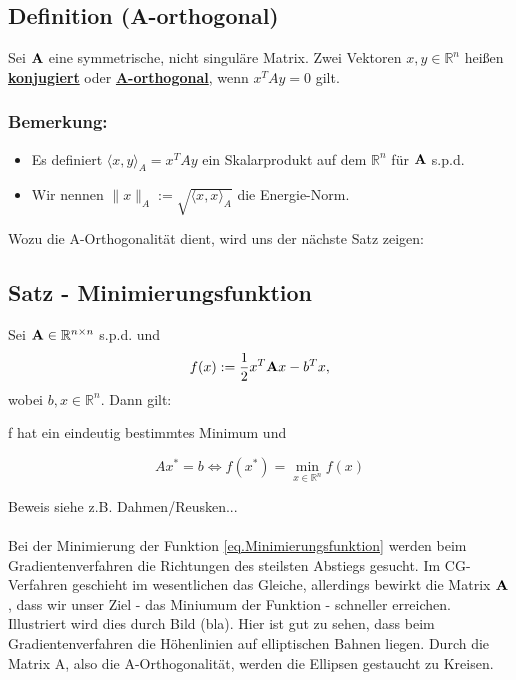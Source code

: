 \subsection{Definition (A-orthogonal)}
Sei ${\textbf{A}}$ eine symmetrische, nicht singuläre Matrix. Zwei Vektoren $x,y \in \mathbb{R}^{n}$ heißen \underline{\textbf{konjugiert}} oder \underline{\textbf{A-orthogonal}}, wenn $x^{T}Ay = 0$ gilt.

\subsubsection{Bemerkung:}
\begin{itemize}
\item Es definiert $\langle x,y \rangle _{A} = x^{T}Ay$ ein Skalarprodukt auf dem $\mathbb{R}^{n}$ für ${\textbf{A}}$ s.p.d.
\item Wir nennen $\|x\|_{A} := \sqrt{\langle x, x \rangle _{A}}$ die Energie-Norm.
\end{itemize}

Wozu die A-Orthogonalität dient, wird uns der nächste Satz zeigen:

\subsection{Satz - Minimierungsfunktion}
Sei ${\textbf{A}}\in\mathbb{R}^{n \times n}$ s.p.d. und
\begin{equation}\label{eq.Minimierungsfunktion}
f(x) := \frac 1 2 x^{T}{\textbf{A}}x - b^{T}x,
\end{equation}
wobei $b,x \in \mathbb{R}^{n}$. Dann gilt:
\begin{center}
f hat ein eindeutig bestimmtes Minimum und
\end{center}
\begin{equation}
Ax^{*} = b \Longleftrightarrow f(x^{*}) = \underset{x\in\mathbb{R}^{n}}{\min} f(x)
\end{equation}

Beweis siehe z.B. Dahmen/Reusken... \\ \\

Bei der Minimierung der Funktion \autoref{eq.Minimierungsfunktion} werden beim Gradientenverfahren die Richtungen des steilsten Abstiegs gesucht. Im CG-Verfahren geschieht im wesentlichen das Gleiche, allerdings bewirkt die Matrix ${\textbf{A}}$, dass wir unser Ziel - das Miniumum der Funktion - schneller erreichen. \\
Illustriert wird dies durch Bild (bla). Hier ist gut zu sehen, dass beim Gradientenverfahren die Höhenlinien auf elliptischen Bahnen liegen. Durch die Matrix A, also die A-Orthogonalität, werden die Ellipsen gestaucht zu Kreisen. \\

